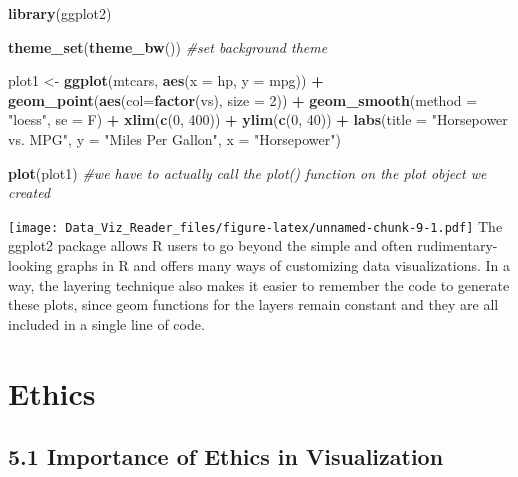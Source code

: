 \documentclass[]{book}
\newenvironment{Shaded}{\begin{snugshade}}{\end{snugshade}}
\newcommand{\KeywordTok}[1]{\textcolor[rgb]{0.13,0.29,0.53}{\textbf{#1}}}
\newcommand{\DataTypeTok}[1]{\textcolor[rgb]{0.13,0.29,0.53}{#1}}
\newcommand{\DecValTok}[1]{\textcolor[rgb]{0.00,0.00,0.81}{#1}}
\newcommand{\StringTok}[1]{\textcolor[rgb]{0.31,0.60,0.02}{#1}}
\newcommand{\CommentTok}[1]{\textcolor[rgb]{0.56,0.35,0.01}{\textit{#1}}}
\newcommand{\OperatorTok}[1]{\textcolor[rgb]{0.81,0.36,0.00}{\textbf{#1}}}
\newcommand{\NormalTok}[1]{#1}
\theoremstyle{definition}
\theoremstyle{definition}
\theoremstyle{definition}
\theoremstyle{remark}
\begin{document}
\begin{Shaded}
\begin{Highlighting}[]
\KeywordTok{library}\NormalTok{(ggplot2)}

\KeywordTok{theme_set}\NormalTok{(}\KeywordTok{theme_bw}\NormalTok{())  }\CommentTok{#set background theme}

\NormalTok{plot1 <-}\StringTok{ }\KeywordTok{ggplot}\NormalTok{(mtcars, }\KeywordTok{aes}\NormalTok{(}\DataTypeTok{x =}\NormalTok{ hp, }\DataTypeTok{y =}\NormalTok{ mpg)) }\OperatorTok{+}\StringTok{ }\KeywordTok{geom_point}\NormalTok{(}\KeywordTok{aes}\NormalTok{(}\DataTypeTok{col=}\KeywordTok{factor}\NormalTok{(vs), }\DataTypeTok{size =} \DecValTok{2}\NormalTok{)) }\OperatorTok{+}\StringTok{ }\KeywordTok{geom_smooth}\NormalTok{(}\DataTypeTok{method =} \StringTok{"loess"}\NormalTok{, }\DataTypeTok{se =}\NormalTok{ F) }\OperatorTok{+}\StringTok{ }\KeywordTok{xlim}\NormalTok{(}\KeywordTok{c}\NormalTok{(}\DecValTok{0}\NormalTok{, }\DecValTok{400}\NormalTok{)) }\OperatorTok{+}\StringTok{ }\KeywordTok{ylim}\NormalTok{(}\KeywordTok{c}\NormalTok{(}\DecValTok{0}\NormalTok{, }\DecValTok{40}\NormalTok{)) }\OperatorTok{+}\StringTok{ }\KeywordTok{labs}\NormalTok{(}\DataTypeTok{title =} \StringTok{"Horsepower vs. MPG"}\NormalTok{, }\DataTypeTok{y =} \StringTok{"Miles Per Gallon"}\NormalTok{, }\DataTypeTok{x =} \StringTok{"Horsepower"}\NormalTok{)}

\KeywordTok{plot}\NormalTok{(plot1)  }\CommentTok{#we have to actually call the plot() function on the plot object we created}
\end{Highlighting}
\end{Shaded}

\texttt{[image: Data\_Viz\_Reader\_files/figure-latex/unnamed-chunk-9-1.pdf]}
The ggplot2 package allows R users to go beyond the simple and often
rudimentary-looking graphs in R and offers many ways of customizing data
visualizations. In a way, the layering technique also makes it easier to
remember the code to generate these plots, since geom functions for the
layers remain constant and they are all included in a single line of
code.

\chapter{Ethics}\label{ethics}

\section{5.1 Importance of Ethics in
Visualization}\label{importance-of-ethics-in-visualization}
\end{document}
